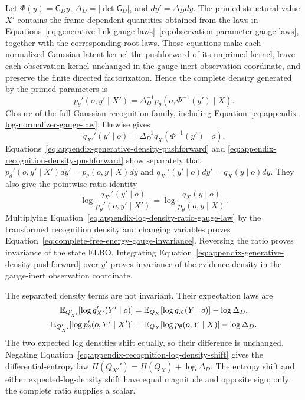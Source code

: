 Let \(\Phi(y)=\mathsf G_Dy\), \(\Delta_D=|\det\mathsf G_D|\), and \(dy'=\Delta_Ddy\). The primed structural value \(X'\) contains the frame-dependent quantities obtained from the laws in Equations~\eqref{eq:generative-link-gauge-laws}--\eqref{eq:observation-parameter-gauge-laws}, together with the corresponding root laws. Those equations make each normalized Gaussian latent kernel the pushforward of its unprimed kernel, leave each observation kernel unchanged in the gauge-inert observation coordinate, and preserve the finite directed factorization. Hence the complete density generated by the primed parameters is
\begin{equation}
p_\theta'(o,y'\mid X')
=\Delta_D^{-1}
p_\theta(o,\Phi^{-1}(y')\mid X).
\label{eq:appendix-generative-density-pushforward}
\end{equation}
Closure of the full Gaussian recognition family, including Equation~\eqref{eq:appendix-log-normalizer-gauge-law}, likewise gives
\begin{equation}
q_{X'}'(y'\mid o)
=\Delta_D^{-1}
q_X(\Phi^{-1}(y')\mid o).
\label{eq:appendix-recognition-density-pushforward}
\end{equation}
Equations~\eqref{eq:appendix-generative-density-pushforward} and \eqref{eq:appendix-recognition-density-pushforward} show separately that \(p_\theta'(o,y'\mid X')dy'=p_\theta(o,y\mid X)dy\) and \(q_{X'}'(y'\mid o)dy'=q_X(y\mid o)dy\). They also give the pointwise ratio identity
\begin{equation}
\log\frac{q_{X'}'(y'\mid o)}
{p_\theta'(o,y'\mid X')}
=\log\frac{q_X(y\mid o)}
{p_\theta(o,y\mid X)}.
\label{eq:appendix-log-density-ratio-gauge-law}
\end{equation}
Multiplying Equation~\eqref{eq:appendix-log-density-ratio-gauge-law} by the transformed recognition density and changing variables proves Equation~\eqref{eq:complete-free-energy-gauge-invariance}. Reversing the ratio proves invariance of the state ELBO. Integrating Equation~\eqref{eq:appendix-generative-density-pushforward} over \(y'\) proves invariance of the evidence density in the gauge-inert observation coordinate.

The separated density terms are not invariant. Their expectation laws are
\begin{align}
\mathbb E_{Q_{X'}'}[\log q_{X'}'(Y'\mid o)]
&=\mathbb E_{Q_X}[\log q_X(Y\mid o)]-\log\Delta_D,
\label{eq:appendix-recognition-log-density-shift}\\
\mathbb E_{Q_{X'}'}[\log p_\theta'(o,Y'\mid X')]
&=\mathbb E_{Q_X}[\log p_\theta(o,Y\mid X)]-\log\Delta_D.
\label{eq:appendix-joint-log-density-shift}
\end{align}
The two expected log densities shift equally, so their difference is unchanged. Negating Equation~\eqref{eq:appendix-recognition-log-density-shift} gives the differential-entropy law \(H(Q_{X'}')=H(Q_X)+\log\Delta_D\). The entropy shift and either expected-log-density shift have equal magnitude and opposite sign; only the complete ratio supplies a scalar.

